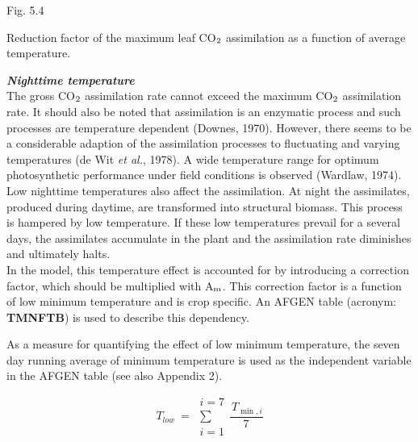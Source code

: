 \documentclass[11pt]{article}
\newcommand{\FigDir}{.}
\begin{document}
\bigskip
\begin{figure}[htbp]
\begin{forcewidth}{8.44cm}
 \begin{center}\InputPS{\FigDir/TMPFTB.eps} \end{center}
\end{forcewidth}
\end{figure}

\bigskip
\bigskip
\bigskip
\bigskip
\bigskip
\bigskip
\bigskip
\bigskip
\bigskip
\bigskip
\bigskip
\bigskip
\bigskip
Fig. 5.4 
\testlastline

\begin{indenting}{2.54cm}
Re\-duc\-tion fac\-tor of the ma\-xi\-mum leaf CO$_{{\rm 2}}$ assimila\-tion as a function of
average tempera\-ture.
\end{indenting}

\bigskip
\bigskip
{\bf {\it Nighttime temperature\/}}\\
The gross CO$_{{\rm 2}}$ assimilation rate cannot exceed the maximum CO$_{{\rm 2}}$ assimilation rate. It
should also be noted that assimilation is an enzymatic process and such processes are
temperature dependent (Downes, 1970). However, there seems to be a consider\-able
adaption of the assimilation processes to fluctuating and varying temperatures (de Wit {\it et
al.\/}, 1978). A wide temperature range for optimum photosynthetic perfor\-mance under field
conditions is observed (Wardlaw, 1974). Low nighttime tempera\-tures also affect the
assimilation. At night the assimilates, produced during daytime, are trans\-formed into
structural biomass. This process is hampered by low temperature. If these low tempera\-tures prevail for a several days, the assimilates accumulate in the plant and the assimila\-tion rate diminishes and ultimately halts.\\
 In the model, this tempera\-ture effect is account\-ed for by introducing a correction factor,
which should be multiplied with A$_{{\rm m}}$. This correction factor is a function of low minimum
tempera\-ture and is crop specific. An AFGEN table (acronym: {\bf TMNFTB}) is used to
describe this dependency.

As a measure for quantifying the effect of low minimum temperature, the seven day
running average of minimum tempera\-ture is used as the independent variable in the
AFGEN table (see also Appendix 2).

\begin{displaymath}
T _{low} ~=~\begin{array}{c}{i=7}  \\
\sum  \\
{i=1}\end{array}{\frac{\, T _{\min ,i} }{7}}
\end{displaymath}
\end{document}
